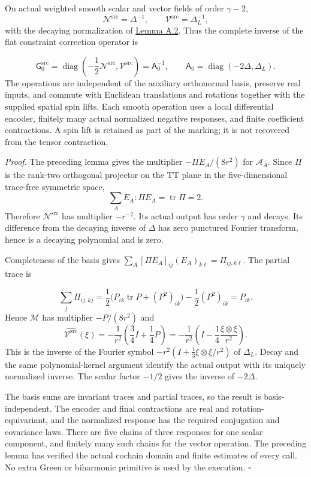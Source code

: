 \documentclass[
  english,
  11pt,
  reqno]{amsart}
\begin{document}
On actual weighted smooth scalar and vector fields of order
\(\gamma-2\), \[
\mathcal N^{\mathrm{src}}=\Delta^{-1},\qquad
\mathcal V^{\mathrm{src}}=\Delta_L^{-1},
\] with the decaying normalization of
\hyperref[lem:online-chart-decaying-flat-inverses]{Lemma A.2}. Thus the
complete inverse of the flat constraint correction operator is

\label{eq:online-negative-response-full-green} \[
\mathsf G_0^{\mathrm{src}}
=\operatorname{diag}\left(-\frac12\mathcal N^{\mathrm{src}},
                          \mathcal V^{\mathrm{src}}\right)
=\mathsf A_0^{-1},\qquad
\mathsf A_0=\operatorname{diag}(-2\Delta,\Delta_L).
\] The operations are independent of the auxiliary orthonormal basis,
preserve real inputs, and commute with Euclidean translations and
rotations together with the supplied spatial spin lifts. Each smooth
operation uses a local differential encoder, finitely many actual
normalized negative responses, and finite coefficient contractions. A
spin lift is retained as part of the marking; it is not recovered from
the tensor contraction.

\emph{Proof.} The preceding lemma gives the multiplier
\(-\Pi E_A/(8r^2)\) for \(\mathcal A_A\). Since \(\Pi\) is the rank-two
orthogonal projector on the TT plane in the five-dimensional trace-free
symmetric space, \[
\sum_AE_A:\Pi E_A=\operatorname{tr}\Pi=2.
\] Therefore \(\mathcal N^{\mathrm{src}}\) has multiplier \(-r^{-2}\).
Its actual output has order \(\gamma\) and decays. Its difference from
the decaying inverse of \(\Delta\) has zero punctured Fourier transform,
hence is a decaying polynomial and is zero.

Completeness of the basis gives
\(\sum_A[\Pi E_A]_{ij}(E_A)_{k\ell}=\Pi_{ij,k\ell}\). The partial trace
is

\label{eq:online-negative-response-partial-trace} \[
\sum_j\Pi_{ij,kj}
=\frac12\bigl(P_{ik}\operatorname{tr}P+(P^2)_{ik}\bigr)
 -\frac12(P^2)_{ik}
=P_{ik}.
\] Hence \(\mathcal M\) has multiplier \(-P/(8r^2)\) and \[
\widehat{\mathcal V^{\mathrm{src}}}(\xi)
=-\frac1{r^2}\left(\frac34I+\frac14P\right)
=-\frac1{r^2}\left(I-\frac14\frac{\xi\otimes\xi}{r^2}\right).
\] This is the inverse of the Fourier symbol
\(-r^2(I+\tfrac13\xi\otimes\xi/r^2)\) of \(\Delta_L\). Decay and the
same polynomial-kernel argument identify the actual output with its
uniquely normalized inverse. The scalar factor \(-1/2\) gives the
inverse of \(-2\Delta\).

The basis sums are invariant traces and partial traces, so the result is
basis-independent. The encoder and final contractions are real and
rotation-equivariant, and the normalized response has the required
conjugation and covariance laws. There are five chains of three
responses for one scalar component, and finitely many such chains for
the vector operation. The preceding lemma has verified the actual
cochain domain and finite estimates of every call. No extra Green or
biharmonic primitive is used by the execution. \hfill\(\square\)
\end{document}
